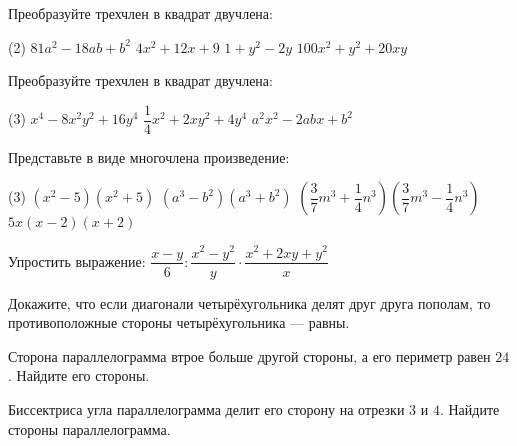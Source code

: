 \begin{consultation}
	\begin{listofex}
		\item Преобразуйте трехчлен в квадрат двучлена:
		\begin{tasks}(2)
			\task \( 81a^2-18ab+b^2 \)
			\task \( 4x^2+12x+9 \)
			\task \( 1+y^2-2y \)
			\task \( 100x^2+y^2+20xy \)
		\end{tasks}
		\item Преобразуйте трехчлен в квадрат двучлена:
		\begin{tasks}(3)
			\task \( x^4-8x^2y^2+16y^4 \)
			\task \( \dfrac{1}{4}x^2+2xy^2+4y^4 \)
			\task \( a^2x^2-2abx+b^2 \)
		\end{tasks}
		\item Представьте в виде многочлена произведение:
		\begin{tasks}(3)
			\task \( (x^2-5)(x^2+5) \)
			\task \( (a^3-b^2)(a^3+b^2) \)
			\task \( \left( \dfrac{3}{7}m^3+\dfrac{1}{4}n^3 \right)\left( \dfrac{3}{7}m^3-\dfrac{1}{4}n^3 \right) \)
			\task \( 5x(x-2)(x+2) \)
		\end{tasks}
		\item Упростить выражение: \( \dfrac{x-y}{6}:\dfrac{x^2-y^2}{y}\cdot\dfrac{x^2+2xy+y^2}{x} \)
		\item Докажите, что если диагонали четырёхугольника делят друг друга пополам, то противоположные стороны четырёхугольника --- равны.
		\item Сторона параллелограмма втрое больше другой стороны, а его периметр равен \( 24 \). Найдите его стороны.
		\item Биссектриса угла параллелограмма делит его сторону на отрезки \( 3 \) и \( 4 \). Найдите стороны параллелограмма.
		
	\end{listofex}
\end{consultation}